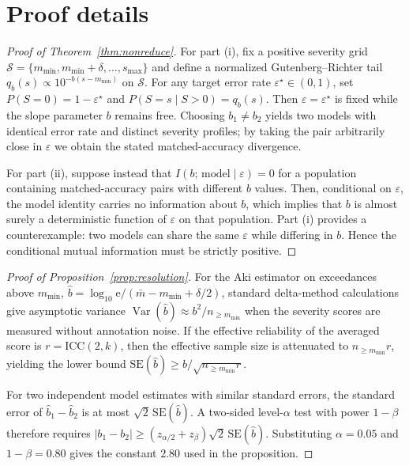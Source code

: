 \documentclass{article}
\begin{document}



\appendix

\section{Proof details}\label{app:proofs}

\begin{proof}[Proof of Theorem~\ref{thm:nonreduce}]
For part (i), fix a positive severity grid
$\mathcal{S}=\{m_{\min}, m_{\min}+\delta, \ldots, s_{\max}\}$ and
define a normalized Gutenberg--Richter tail
$q_b(s) \propto 10^{-b(s-m_{\min})}$ on $\mathcal{S}$. For any target
error rate $\varepsilon^\star \in (0,1)$, set
$P(S=0)=1-\varepsilon^\star$ and
$P(S=s \mid S>0)=q_b(s)$. Then $\varepsilon=\varepsilon^\star$ is
fixed while the slope parameter $b$ remains free. Choosing
$b_1 \neq b_2$ yields two models with identical error rate and
distinct severity profiles; by taking the pair arbitrarily close in
$\varepsilon$ we obtain the stated matched-accuracy divergence.

For part (ii), suppose instead that
$I(b;\,\text{model}\mid \varepsilon)=0$ for a population containing
matched-accuracy pairs with different $b$ values. Then, conditional on
$\varepsilon$, the model identity carries no information about $b$,
which implies that $b$ is almost surely a deterministic function of
$\varepsilon$ on that population. Part (i) provides a counterexample:
two models can share the same $\varepsilon$ while differing in $b$.
Hence the conditional mutual information must be strictly positive.
\end{proof}

\begin{proof}[Proof of Proposition~\ref{prop:resolution}]
For the Aki estimator on exceedances above $m_{\min}$,
$\hat{b} = \log_{10}\mathrm{e}/(\bar{m}-m_{\min}+\delta/2)$, standard
delta-method calculations give asymptotic variance
$\operatorname{Var}(\hat{b}) \approx b^2/n_{\geq m_{\min}}$ when the
severity scores are measured without annotation noise. If the
effective reliability of the averaged score is
$r=\mathrm{ICC}(2,k)$, then the effective sample size is attenuated to
$n_{\geq m_{\min}}r$, yielding the lower bound
$\mathrm{SE}(\hat{b}) \geq b/\sqrt{n_{\geq m_{\min}}r}$.

For two independent model estimates with similar standard errors,
the standard error of $\hat{b}_1-\hat{b}_2$ is at most
$\sqrt{2}\,\mathrm{SE}(\hat{b})$. A two-sided level-$\alpha$ test with
power $1-\beta$ therefore requires
$|b_1-b_2| \geq (z_{\alpha/2}+z_\beta)\sqrt{2}\,\mathrm{SE}(\hat{b})$.
Substituting $\alpha=0.05$ and $1-\beta=0.80$ gives the constant
$2.80$ used in the proposition.
\end{proof}
\end{document}
